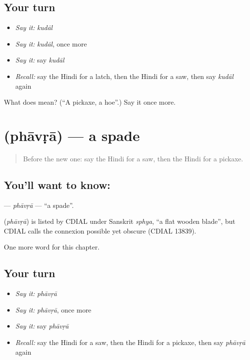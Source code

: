 \subsection*{Your turn}
\begin{itemize}
\raggedright
  \item \emph{Say it:} \emph{kudāl}
  \item \emph{Say it:} \emph{kudāl}, once more
  \item \emph{Say it:} say \emph{kudāl}
  \item \emph{Recall:} say the Hindi for a latch, then the Hindi for a saw, then say \emph{kudāl} again
\end{itemize}

\begin{tcolorbox}[breakable,colback=teal!4,colframe=teal!35!black,title={Before you move on}]
What does  mean? (\textquotedblleft{}A pickaxe, a hoe\textquotedblright{}.) Say it once more.
\end{tcolorbox}
\section[\texorpdfstring{\hi{फावड़ा} (phāvṛā)}{फावड़ा (phāvṛā)}]{ (phāvṛā) — a spade}

\label{lesson:HI-C266-phavra}



\begin{quote}
Before the new one: say the Hindi for a saw, then the Hindi for a pickaxe.
\end{quote}

\subsection*{You'll want to know: }
\textbf{} — \emph{phāvṛā} — \textquotedblleft{}a spade\textquotedblright{}.

\begin{cousinweb}
\textbf{} (\emph{phāvṛā}) is listed by CDIAL under Sanskrit \emph{sphya}, \textquotedblleft{}a flat wooden blade\textquotedblright{}, but CDIAL calls the connexion possible yet obscure (CDIAL 13839).
\end{cousinweb}

\begin{grammarlens}[title={What you've built}]
One more word for this chapter.
\end{grammarlens}

\subsection*{Your turn}
\begin{itemize}
\raggedright
  \item \emph{Say it:} \emph{phāvṛā}
  \item \emph{Say it:} \emph{phāvṛā}, once more
  \item \emph{Say it:} say \emph{phāvṛā}
  \item \emph{Recall:} say the Hindi for a saw, then the Hindi for a pickaxe, then say \emph{phāvṛā} again
\end{itemize}

